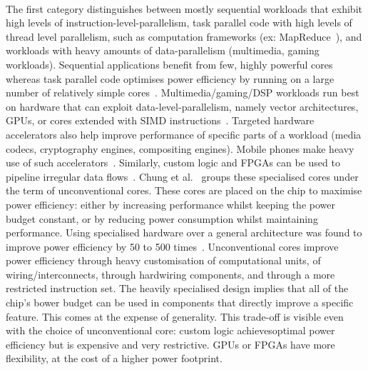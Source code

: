 \paragraph{} The first category distinguishes between mostly sequential workloads that exhibit high levels of instruction-level-parallelism, task parallel code with high levels of thread level parallelism, such as computation frameworks
(ex: MapReduce~\cite{dean2004mapreduce}), and workloads with heavy amounts of data-parallelism (multimedia, gaming workloads). Sequential applications benefit from few, highly powerful cores whereas task parallel code optimises power efficiency by running on a large number of relatively simple cores~\cite{Kumar:2005:HCM:1100859.1100890}. Multimedia/gaming/DSP workloads run best on hardware that can exploit data-level-parallelism, namely vector architectures, GPUs, or cores extended with SIMD instructions~\cite{Rossbach:2013:DCR:2517349.2522715}. Targeted hardware accelerators also help improve performance of specific parts of a workload (media codecs, cryptography engines, compositing engines)\cite{borkar2011future}. Mobile phones make 
heavy use of such accelerators~\cite{borkar2011future}. Similarly, custom logic and FPGAs can be used to pipeline irregular data flows~\cite{5695539}.
Chung et al.~\cite{5695539} groups these specialised cores under the term of unconventional cores. These cores are placed on the chip to maximise power efficiency: 
either by increasing performance whilst keeping the power budget constant,
or by reducing power consumption whilst maintaining performance. Using specialised hardware over a general architecture was found to improve power efficiency by 50 to 500 times~\cite{borkar2011future}.
Unconventional cores improve power efficiency through heavy customisation of computational units, of wiring/interconnects, through hardwiring components, and through a more restricted instruction set. The heavily specialised design implies that all of the chip's bower budget can be used in components that directly improve a specific feature. This comes at the expense of generality. This trade-off is visible even with the choice of unconventional core: custom logic achievesoptimal power efficiency but is expensive and very restrictive. GPUs or FPGAs have more flexibility, at the cost of a higher power footprint.  

